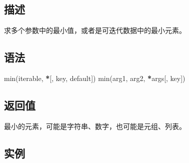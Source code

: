 \documentclass[]{ctexbook}
\newenvironment{Shaded}{\begin{snugshade}}{\end{snugshade}}
\newcommand{\BuiltInTok}[1]{#1}
\newcommand{\NormalTok}[1]{#1}
\newcommand{\OperatorTok}[1]{\textcolor[rgb]{0.81,0.36,0.00}{\textbf{#1}}}
\begin{document}
\hypertarget{ux63cfux8ff0-3}{%
\subsection{描述}\label{ux63cfux8ff0-3}}

求多个参数中的最小值，或者是可迭代数据中的最小元素。

\hypertarget{ux8bedux6cd5-3}{%
\subsection{语法}\label{ux8bedux6cd5-3}}

\begin{Shaded}
\begin{Highlighting}[]
\BuiltInTok{min}\NormalTok{(iterable, }\OperatorTok{*}\NormalTok{[, key, default])}
\BuiltInTok{min}\NormalTok{(arg1, arg2, }\OperatorTok{*}\NormalTok{args[, key])}
\end{Highlighting}
\end{Shaded}

\hypertarget{ux8fd4ux56deux503c-3}{%
\subsection{返回值}\label{ux8fd4ux56deux503c-3}}

最小的元素，可能是字符串、数字，也可能是元组、列表。

\hypertarget{ux5b9eux4f8b-3}{%
\subsection{实例}\label{ux5b9eux4f8b-3}}
\end{document}
